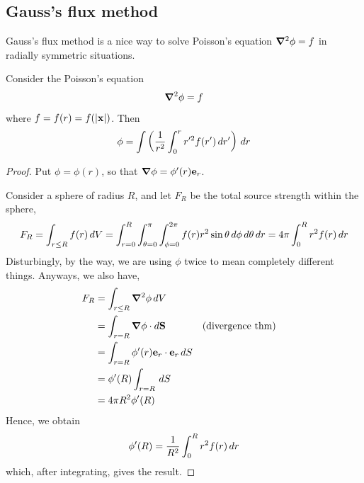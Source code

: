 \documentclass{../../template/note}
\begin{document}
    \subsection{Gauss's flux method}

    Gauss's flux method is a nice way to solve Poisson's equation \(\grad^2\phi = f\) in radially symmetric situations.
    
    \begin{theorem}
        Consider the Poisson's equation
        \begin{align*}
            \grad^2 \phi = f
        \end{align*}
        where \(f = f(r) = f(|\V x|)\). Then
        \begin{align*}
            \phi = \int \left(\frac 1{r^2} \int_0^r r'^2 f(r') \,d{r}'\right) \,d{r}
        \end{align*}
    \end{theorem}
    
    \begin{proof}
        Put \(\phi = \phi(r)\), so that \(\grad \phi = \phi'(r)\V e_r\).
        
        Consider a sphere of radius \(R\), and let \(F_R\) be the total source strength within the sphere,
        \begin{align*}
            F_R = \int_{r \leq R} f(r) \,d{V} = \int_{r=0}^R \int_{\theta=0}^{\pi} \int_{\phi=0}^{2\pi} f(r) r^2 \sin \theta \,d{\phi} \,d{\theta} \,d{r} = 4\pi \int_0^R r^2 f(r) \,d{r}
        \end{align*}
        Disturbingly, by the way, we are using \(\phi\) twice to mean completely different things. Anyways, we also have,
        \begin{align*}
            F_R &= \int_{r \leq R} \grad^2 \phi \D V \\
            &= \int_{r = R} \grad \phi \cdot d\V S && \text{(divergence thm)} \\
            &= \int_{r = R} \phi'(r) \V e_r \cdot \V e_r \D S \\
            &= \phi'(R) \int_{r=R}\D S \\
            &= 4\pi R^2 \phi'(R)
        \end{align*}
        Hence, we obtain
        \begin{align*}
            \phi'(R) = \frac 1{R^2} \int_0^R r^2f(r) \,d{r}
        \end{align*}
        which, after integrating, gives the result.        
    \end{proof}
    
\end{document}
